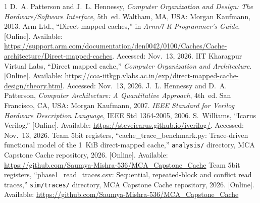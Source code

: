 \documentclass[conference,a4paper]{IEEEtran}
\begin{document}
\begin{thebibliography}{1}\label{sec:refs}
 D.~A. Patterson and J.~L. Hennessy, \emph{Computer Organization and Design: The Hardware/Software Interface}, 5th~ed. Waltham, MA, USA: Morgan Kaufmann, 2013.
 Arm Ltd., ``Direct-mapped caches,'' in \emph{Armv7-R Programmer's Guide}. [Online]. Available: \url{https://support.arm.com/documentation/den0042/0100/Caches/Cache-architecture/Direct-mapped-caches}. Accessed: Nov.~13, 2026.
 IIT Kharagpur Virtual Labs, ``Direct mapped cache,'' \emph{Computer Organization and Architecture}. [Online]. Available: \url{https://coa-iitkgp.vlabs.ac.in/exp/direct-mapped-cache-design/theory.html}. Accessed: Nov.~13, 2026.
 J.~L. Hennessy and D.~A. Patterson, \emph{Computer Architecture: A Quantitative Approach}, 4th~ed. San Francisco, CA, USA: Morgan Kaufmann, 2007.
 \emph{IEEE Standard for Verilog Hardware Description Language}, IEEE Std 1364-2005, 2006.
 S.~Williams, ``Icarus Verilog.'' [Online]. Available: \url{https://steveicarus.github.io/iverilog/}. Accessed: Nov.~13, 2026.
 Team 5bit registers, ``cache\_trace\_benchmark.py: Trace-driven functional model of the 1~KiB direct-mapped cache,'' \texttt{analysis/} directory, MCA Capstone Cache repository, 2026. [Online]. Available: \url{https://github.com/Saumya-Mishra-536/MCA_Capstone_Cache}
 Team 5bit registers, ``phase1\_read\_traces.csv: Sequential, repeated-block and conflict read traces,'' \texttt{sim/traces/} directory, MCA Capstone Cache repository, 2026. [Online]. Available: \url{https://github.com/Saumya-Mishra-536/MCA_Capstone_Cache}
\end{thebibliography}
\end{document}
